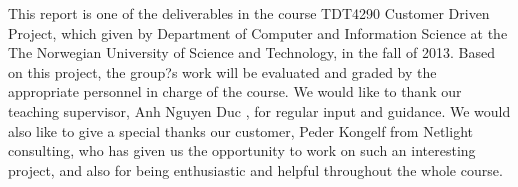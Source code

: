 This report is one of the deliverables in the course TDT4290 Customer Driven Project, which given by Department of Computer and Information Science at the The Norwegian University of Science and Technology, in the fall of 2013. Based on this project, the group?s work will be evaluated and graded by the appropriate personnel in charge of the course. 
We would like to thank our teaching supervisor, Anh Nguyen Duc , for regular input and guidance. 
We would also like to give a special thanks our customer, Peder  Kongelf from  Netlight consulting, who has given us the opportunity to work on such an interesting project, and also for being enthusiastic and helpful throughout the whole course.